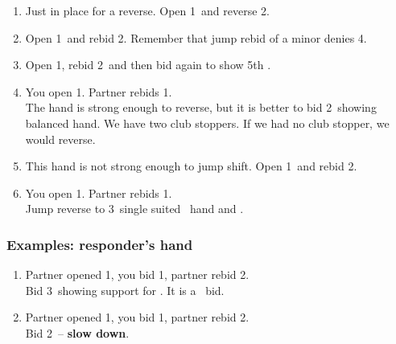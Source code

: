 \documentclass[12pt, a4paper]{article}
\begin{document}
\begin{enumerate}
    \item
        Just in place for a reverse. Open 1\clubs\ and reverse 2\hearts.
    \item
        Open 1\diams\ and rebid 2\hearts. Remember that jump rebid of a minor 
        denies 4\majs.
    \item 
        Open 1\clubs, rebid 2\hearts\ and then bid again to show 5th \hearts.
    \item 
        You open 1\diams. Partner rebids 1\spades. \\
        The hand is strong enough to reverse, but
        it is better to bid 2\nt\ showing balanced hand. We have two club stoppers. If we had no
        club stopper, we would reverse.
    \item 
        This hand is not strong enough to jump shift. Open 1\diams\ and rebid 2\clubs.
    \item
        You open 1\clubs. Partner rebids 1\spades. \\
        Jump reverse to 3\diams\ single suited \clubs\ hand and \gf.
        
\end{enumerate}

\subsubsection*{Examples: responder's hand}
\begin{enumerate}
    \item
        Partner opened 1\diams, you bid 1\spades, partner rebid 2\hearts. \\
        Bid 3\diams\ showing support for \diams. It is a \gf\ bid.
    \item
        Partner opened 1\diams, you bid 1\spades, partner rebid 2\hearts. \\
        Bid 2\nt\ -- \textbf{slow down}.
\end{enumerate}
\end{document}

